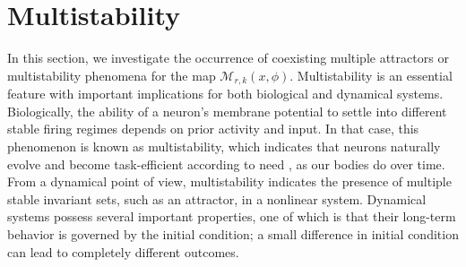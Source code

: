 \documentclass{article}
\begin{document}




\section{Multistability} In this section, we investigate the occurrence of coexisting multiple attractors or multistability phenomena for the map $\mathcal{M}_{r,k}(x,\phi)$. Multistability is an essential feature with important implications for both biological and dynamical systems. Biologically, the ability of a neuron's membrane potential to settle into different stable firing regimes depends on prior activity and input. In that case, this phenomenon is known as multistability, which indicates that neurons naturally evolve and become task-efficient according to need , as our bodies do over time. From a dynamical point of view, multistability indicates the presence of multiple stable invariant sets, such as an attractor, in a nonlinear system. Dynamical systems possess several important properties, one of which is that their long-term behavior is governed by the initial condition; a small difference in initial condition can lead to completely different outcomes.
\end{document}
